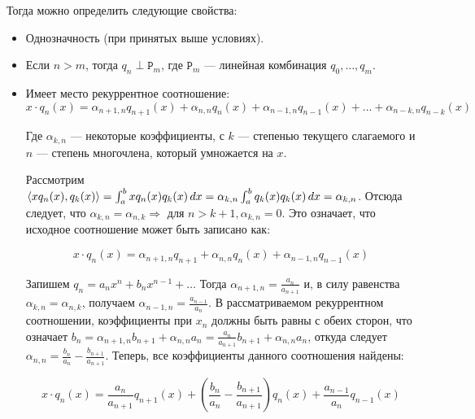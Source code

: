 \documentclass[12pt]{article}
\begin{document}
		Тогда можно определить следующие свойства:

		\begin{itemize}
			\item Однозначность (при принятых выше условиях).
			\item Если $n > m$, тогда $q_n \perp \mathtt{P}_m$, где $\mathtt{P}_m$ --- линейная комбинация $q_0, \dots , q_m$.
			\item Имеет место рекуррентное соотношение:
			$$ x \cdot q_n(x) = 
			\alpha_{n+1,n} q_{n+1}(x) + \alpha_{n,n} q_n(x) + \alpha_{n-1, n} q_{n-1} (x) + \ldots + \alpha_{n-k, n} q_{n-k} (x) $$
		
				Где $\alpha_{k, n}$ --- некоторые коэффициенты, с $k$ --- степенью текущего слагаемого и
				$n$ --- степень многочлена, который умножается на $x$.

				Рассмотрим $\left\langle x q_n(x), q_k(x) \right\rangle = \int_a^b x q_n(x) q_k(x) \,dx
					        = \alpha_{k,n} \int_a^b q_k(x) q_k(x) \,dx = \alpha_{k,n}$.
				Отсюда следует, что $\alpha_{k,n} = \alpha_{n,k} \Rightarrow$ для $n > k+1,\alpha_{k,n} = 0$. 
				Это означает, что исходное соотношение может быть записано как:

				$$ x \cdot q_n(x) = 
				\alpha_{n+1,n} q_{n+1} + \alpha_{n,n} q_n(x) + \alpha_{n-1, n} q_{n-1} (x)$$

				Запишем $q_n = a_n x^n + b_n x^{n-1} + \ldots$
				Тогда $\alpha_{n+1, n} = \frac{a_n}{a_{n+1}}$ и, в силу равенства $\alpha_{k,n} =
				\alpha_{n,k}$, получаем $\alpha_{n-1, n} = \frac{a_{n-1}}{a_n}$. В рассматриваемом
				рекуррентном соотношении, коэффициенты при $x_n$ должны быть равны с обеих
				сторон, что означает $b_n = \alpha_{n+1, n} b_{n+1} + \alpha_{n,n} a_n =
				\frac{a_n}{a_{n+1}} b_{n+1} + \alpha_{n,n} a_n$, откуда следует $\alpha_{n,n} =
				\frac{b_n}{a_n} - \frac{b_{n+1}}{a_{n+1}}$. Теперь, все коэффициенты данного соотношения
				найдены:

				\begin{equation}
					\label{eq:recurrent}
					x \cdot q_n(x) = \frac{a_n}{a_{n+1}} q_{n+1} (x) + 
					\left(\frac{b_n}{a_n} - \frac{b_{n+1}}{a_{n+1}}\right) q_n(x) + \frac{a_{n-1}}{a_n} q_{n-1}(x)
				\end{equation}
		\end{itemize}
\end{document}
